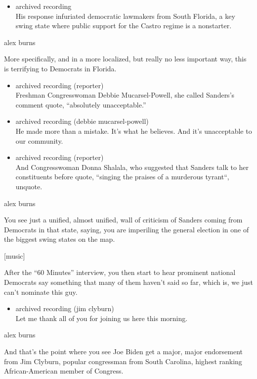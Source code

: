\begin{itemize}
\tightlist
\item
  archived recording\\
  His response infuriated democratic lawmakers from South Florida, a key
  swing state where public support for the Castro regime is a
  nonstarter.
\end{itemize}

alex burns

More specifically, and in a more localized, but really no less important
way, this is terrifying to Democrats in Florida.

\begin{itemize}
\item
  archived recording (reporter)\\
  Freshman Congresswoman Debbie Mucarsel-Powell, she called Sanders's
  comment quote, ``absolutely unacceptable.''
\item
  archived recording (debbie mucarsel-powell)\\
  He made more than a mistake. It's what he believes. And it's
  unacceptable to our community.
\item
  archived recording (reporter)\\
  And Congresswoman Donna Shalala, who suggested that Sanders talk to
  her constituents before quote, ``singing the praises of a murderous
  tyrant``, unquote.
\end{itemize}

alex burns

You see just a unified, almost unified, wall of criticism of Sanders
coming from Democrats in that state, saying, you are imperiling the
general election in one of the biggest swing states on the map.

{[}music{]}

After the ``60 Minutes'' interview, you then start to hear prominent
national Democrats say something that many of them haven't said so far,
which is, we just can't nominate this guy.

\begin{itemize}
\tightlist
\item
  archived recording (jim clyburn)\\
  Let me thank all of you for joining us here this morning.
\end{itemize}

alex burns

And that's the point where you see Joe Biden get a major, major
endorsement from Jim Clyburn, popular congressman from South Carolina,
highest ranking African-American member of Congress.

